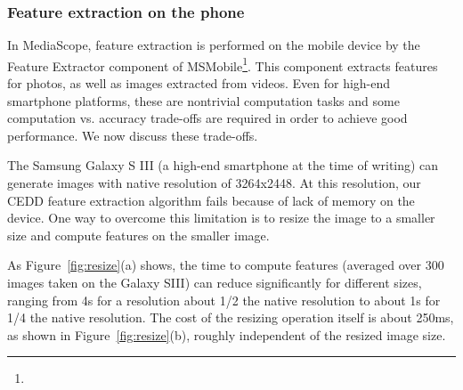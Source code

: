 
\subsubsection{Feature extraction on the phone}
\label{sec-3-2-3}

In MediaScope, feature extraction is performed on the mobile device by
the Feature Extractor component of MSMobile\footnote{}.
%
This component extracts features for photos, as well as images
extracted from videos.
%
Even for high-end smartphone platforms, these are nontrivial
computation tasks and some computation vs. accuracy trade-offs are
required in order to achie\-ve good performance.
%
We now discuss these trade-offs.

%
The Samsung Galaxy S III (a high-end smartphone at the time of
writing) can  generate images with native resolution of 3264x2448.
%
At this resolution, our CEDD feature extraction algorithm fails
because of lack of memory on the device.
%
One way to overcome this limitation is to resize the image to a
smaller size and compute features on the smaller image.
%

As Figure~\ref{fig:resize}(a) shows, the time to compute features
(averaged over 300 images taken on the Galaxy SIII) can reduce
significantly for different sizes, ranging from 4s for a resolution
about 1/2 the native resolution to about 1s for 1/4 the native
resolution.
%
The cost of the resizing operation itself is about 250ms, as shown
in Figure~\ref{fig:resize}(b), roughly independent of the resized
image size.


